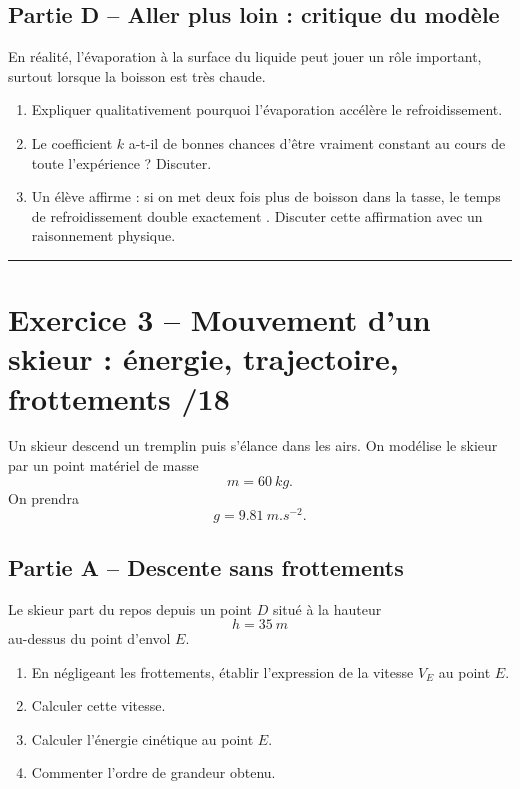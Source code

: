 \documentclass[11pt,a4paper]{article}
\begin{document}
\subsection*{Partie D -- Aller plus loin : critique du modèle}
En réalité, l’évaporation à la surface du liquide peut jouer un rôle important, surtout lorsque la boisson est très chaude.

\begin{enumerate}[label=\textbf{2.\arabic*}, resume, leftmargin=1.6em]
    \item Expliquer qualitativement pourquoi l’évaporation accélère le refroidissement.
    \item Le coefficient $k$ a-t-il de bonnes chances d’être vraiment constant au cours de toute l’expérience ? Discuter.
    \item Un élève affirme : \og si on met deux fois plus de boisson dans la tasse, le temps de refroidissement double exactement \fg.  
    Discuter cette affirmation avec un raisonnement physique.
\end{enumerate}

\vspace{0.5em}
\hrule
\vspace{0.6em}

\section*{Exercice 3 -- Mouvement d’un skieur : énergie, trajectoire, frottements \hfill /18}

Un skieur descend un tremplin puis s’élance dans les airs.  
On modélise le skieur par un point matériel de masse
\[
m=\SI{60}{kg}.
\]
On prendra
\[
g=\SI{9,81}{m.s^{-2}}.
\]

\subsection*{Partie A -- Descente sans frottements}
Le skieur part du repos depuis un point $D$ situé à la hauteur
\[
h=\SI{35}{m}
\]
au-dessus du point d’envol $E$.

\begin{enumerate}[label=\textbf{3.\arabic*}, leftmargin=1.6em]
    \item En négligeant les frottements, établir l’expression de la vitesse $V_E$ au point $E$.
    \item Calculer cette vitesse.
    \item Calculer l’énergie cinétique au point $E$.
    \item Commenter l’ordre de grandeur obtenu.
\end{enumerate}
\end{document}

